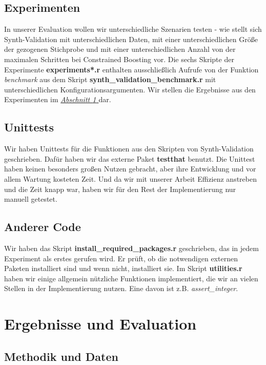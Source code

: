 \documentclass[12pt,a4paper,twoside]{scrartcl}
\numberwithin{equation}{section}
\newcommand{\refsec}[1]{\emph{\hyperref[#1]{Abschnitt \ref*{#1} }}}
\begin{document}
\subsection{Experimenten}\label{subsec:experimenten}
In unserer Evaluation wollen wir unterschiedliche Szenarien testen - wie stellt sich Synth-Validation mit unterschiedlichen Daten, mit einer unterschiedlichen Größe der gezogenen Stichprobe und mit einer unterschiedlichen Anzahl von der maximalen Schritten bei Constrained Boosting vor. Die sechs Skripte der Experimente \textbf{experiments*.r} enthalten ausschließlich Aufrufe von der Funktion \emph{benchmark} aus dem Skript \textbf{synth\_validation\_benchmark.r} mit unterschiedlichen Konfigurationsargumenten. Wir stellen die Ergebnisse aus den Experimenten im \refsec{sec:ergebnisseEvaluation} dar.\par

\subsection{Unittests}\label{subsec:unitTests}
Wir haben Unittests für die Funktionen aus den Skripten von Synth-Validation geschrieben. Dafür haben wir das externe Paket \textbf{testthat} benutzt. Die Unittest haben keinen besonders großen Nutzen gebracht, aber ihre Entwicklung und vor allem Wartung kosteten Zeit. Und da wir mit unserer Arbeit Effizienz anstreben und die Zeit knapp war, haben wir für den Rest der Implementierung nur manuell getestet.\par 
      	  	
\subsection{Anderer Code}\label{subsec:andererCode}
Wir haben das Skript \textbf{install\_required\_packages.r} geschrieben, das in jedem Experiment als erstes gerufen wird. Er prüft, ob die notwendigen externen Paketen installiert sind und wenn nicht, installiert sie. Im Skript \textbf{utilities.r} haben wir einige allgemein nützliche Funktionen implementiert, die wir an vielen Stellen in der Implementierung nutzen. Eine davon ist z.B. \emph{assert\_integer}.   

\clearpage

\section{Ergebnisse und Evaluation}\label{sec:ergebnisseEvaluation}
  	\subsection{Methodik und Daten}\label{subsec:methodikDaten}
\end{document}
